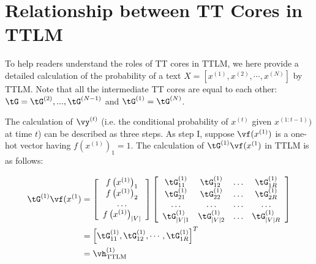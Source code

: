 \documentclass{article}
\theoremstyle{plain}
\theoremstyle{definition}
\theoremstyle{remark}
\begin{document}




\newpage
\appendix
\onecolumn

\section{Relationship between TT Cores in TTLM}
\label{sec: relationship}

To help readers understand the roles of TT cores in TTLM, we here provide a detailed calculation of the probability of a text $X = [x^{(1)}, x^{(2)}, \cdots ,x^{(N)}]$ by TTLM. Note that all the intermediate TT cores are equal to each other: $\tG = \tG^{(2)},...,\tG^{(N-1)}$ and $\tG^{(1)} = \tG^{(N)}$. 

The calculation of $\vy^{(t)}$ (i.e. the conditional probability of $x^{(t)}$ given  $x^{(1:t-1)})$ at time $t$) can be described as three steps. As step I, suppose $\vf(x^{(1)})$ is a one-hot vector having $f(x^{(1)})_1 = 1$. The calculation of $\tG^{(1)}\vf(x^{(1})$ in TTLM is as follows:

\begin{align}
\tG^{(1)}\vf(x^{(1}) &= 
\left[\begin{array}{c}
f\left(x^{(1)}\right)_1 \\
f\left(x^{(1)}\right)_2 \\
\ldots \\
f\left(x^{(1)}\right)_{|V|}
\end{array}\right] \left[\begin{array}{cccc}
\tG_{11}^{(1)} & \tG_{12}^{(1)} & \ldots & \tG_{1 R}^{(1)} \\
\tG_{21}^{(1)} & \tG_{22}^{(1)} & \ldots & \tG_{2 R}^{(1)} \\
\ldots & \ldots & \ldots & \ldots \\
\tG_{|V| 1}^{(1)} & \tG_{|V| 2}^{(1)} & \ldots & \tG_{|V| R}^{(1)}
\end{array}\right] \nonumber \\ 
&=\left[\tG_{11}^{(1)}, \tG_{12}^{(1)}, \cdots, \tG_{1R}^{(1)}\right]^T \nonumber \\ 
&=\vh_{\textrm{TTLM}}^{(1)} \nonumber
\end{align}
\end{document}

